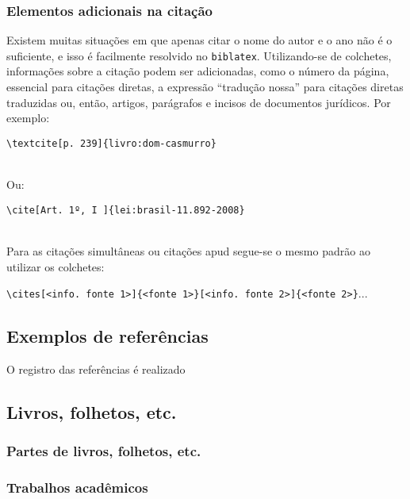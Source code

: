 
\subsubsection{Elementos adicionais na citação}
Existem muitas situações em que apenas citar o nome do autor e o ano não é o suficiente, e isso é facilmente resolvido no \verb|biblatex|. Utilizando-se de colchetes, informações sobre a citação podem ser adicionadas, como o número da página, essencial para citações diretas, a expressão ``tradução nossa'' para citações diretas traduzidas ou, então, artigos, parágrafos e incisos de documentos jurídicos. Por exemplo:

\verb|\textcite[p. 239]{livro:dom-casmurro}|

\textcite[p. 239]{livro:dom-casmurro}\\

Ou:

\verb|\cite[Art. 1º, I ]{lei:brasil-11.892-2008}|

\cite[Art. 1º, I ]{lei:brasil-11.892-2008}\\

Para as citações simultâneas ou citações apud segue-se o mesmo padrão ao utilizar os colchetes:

\verb|\cites[<info. fonte 1>]{<fonte 1>}[<info. fonte 2>]{<fonte 2>}|...

\subsection{Exemplos de referências}
O registro das referências é realizado

\subsection{Livros, folhetos, etc.}



\subsubsection{Partes de livros, folhetos, etc.}



\subsubsection{Trabalhos acadêmicos}

